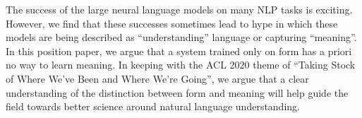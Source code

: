 The success of the large neural language models on many NLP tasks is exciting. However, we find that these successes sometimes lead to hype in which these models are being described as ``understanding'' language or capturing ``meaning''. In this position paper, we argue that a system trained only on form has a priori no way to learn meaning. In keeping with the ACL 2020 theme of ``Taking Stock of Where We've Been and Where We're Going'', we argue that a clear understanding of the distinction between form and meaning will help guide the field towards better science around natural language understanding.
